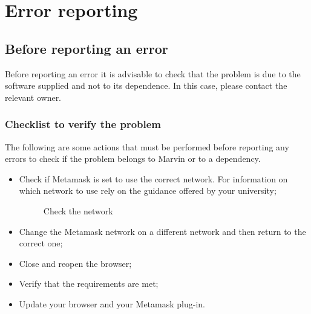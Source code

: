 \documentclass[ManualeUtente]{subfiles}
\begin{document}
\chapter{Error reporting}
\section{Before reporting an error}
Before reporting an error it is advisable to check that the problem is due to the software supplied and not to its dependence. In this case, please contact the relevant owner. \\

\subsection{Checklist to verify the problem}
The following are some actions that must be performed before reporting any errors to check if the problem belongs to Marvin or to a dependency.

\begin{itemize}
	\item Check if Metamask is set to use the correct network. For information on which network to use rely on the guidance offered by your university;
	\begin{figure}[H]
		\centering
		\caption{Check the network}
		\label{fig:Check the network}
	\end{figure}
	\item Change the Metamask network on a different network and then return to the correct one;
	\item Close and reopen the browser;
	\item Verify that the requirements are met;
	\item Update your browser and your Metamask plug-in.
\end{itemize}
\end{document}

